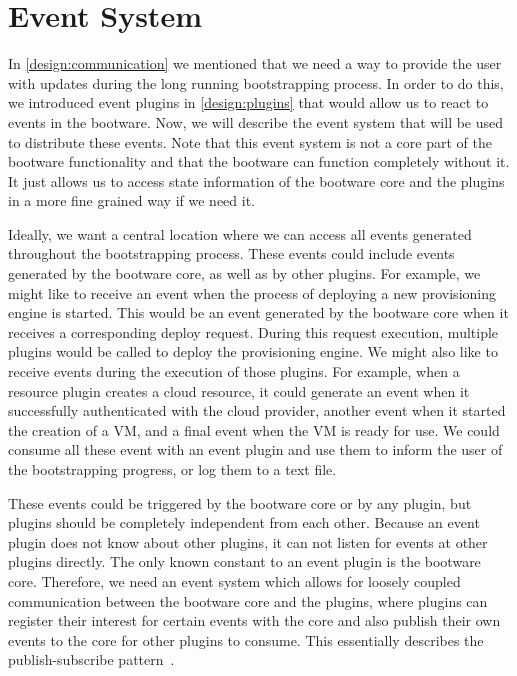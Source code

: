 \section{Event System}
\label{design:internalcomm}

In \autoref{design:communication} we mentioned that we need a way to provide the user with updates during the long running bootstrapping process.
In order to do this, we introduced event plugins in \autoref{design:plugins} that would allow us to react to events in the bootware.
Now, we will describe the event system that will be used to distribute these events.
Note that this event system is not a core part of the bootware functionality and that the bootware can function completely without it.
It just allows us to access state information of the bootware core and the plugins in a more fine grained way if we need it.

Ideally, we want a central location where we can access all events generated throughout the bootstrapping process.
These events could include events generated by the bootware core, as well as by other plugins.
For example, we might like to receive an event when the process of deploying a new provisioning engine is started.
This would be an event generated by the bootware core when it receives a corresponding deploy request.
During this request execution, multiple plugins would be called to deploy the provisioning engine.
We might also like to receive events during the execution of those plugins.
For example, when a resource plugin creates a cloud resource, it could generate an event when it successfully authenticated with the cloud provider, another event when it started the creation of a VM, and a final event when the VM is ready for use.
We could consume all these event with an event plugin and use them to inform the user of the bootstrapping progress, or log them to a text file.

These events could be triggered by the bootware core or by any plugin, but plugins should be completely independent from each other.
Because an event plugin does not know about other plugins, it can not listen for events at other plugins directly.
The only known constant to an event plugin is the bootware core.
Therefore, we need an event system which allows for loosely coupled communication between the bootware core and the plugins, where plugins can register their interest for certain events with the core and also publish their own events to the core for other plugins to consume.
This essentially describes the publish-subscribe pattern~\autocite{pubsub}.

